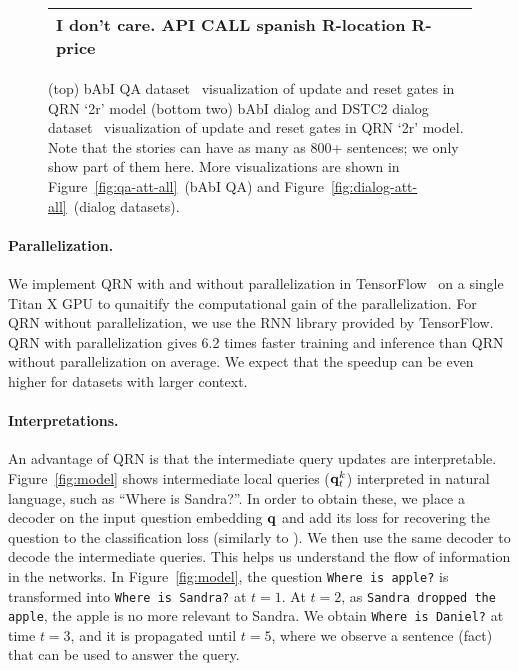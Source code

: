 \documentclass[table]{article}
\begin{document}
\begin{figure}[t]
{\begin{tabular}{|p{6.5cm}|ccc|c|}
    \hline
    
    \multicolumn{5}{|l|}{I don't care. \hfill API CALL spanish R-location R-price}\\
    
    \hline
    \end{tabular}
    }
    
    \caption{\small (top) bAbI QA dataset~\citep{babi} visualization of update and reset gates in QRN `2r' model (bottom two) bAbI dialog and DSTC2 dialog dataset~\citep{bordes2016learning} visualization of update and reset gates in QRN `2r' model.
Note that the stories can have as many as 800+ sentences; we only show part of them here. More visualizations are shown in Figure~\ref{fig:qa-att-all}~(bAbI QA) and Figure~\ref{fig:dialog-att-all}~(dialog datasets).
    }
    \label{fig:att-summary}
\end{figure}




\paragraph{Parallelization.}
We implement QRN with and without parallelization in TensorFlow~\citep{tensorflow} on a single Titan X GPU to qunaitify the computational gain of the parallelization.
For QRN without parallelization, we use the RNN library provided by TensorFlow. 
QRN with parallelization gives 6.2 times faster training and inference than QRN without parallelization on average.
We expect that the speedup can be even higher for datasets with larger context.

\paragraph{Interpretations.}
An advantage of QRN is that the intermediate query updates are interpretable.
Figure~\ref{fig:model} shows intermediate local queries (${\bf q}^k_t$) interpreted in natural language, such as ``Where is Sandra?''.
In order to obtain these, we place a decoder on the input question embedding ${\bf q}$ and add its loss for recovering the question to the classification loss (similarly to \citet{NR}).
We then use the same decoder to decode the intermediate queries.
This helps us understand the flow of information in the networks. 
In Figure~\ref{fig:model}, the question \texttt{Where is apple?} is transformed into \texttt{Where is Sandra?} at $t=1$.
At $t=2$, as \texttt{Sandra dropped the apple}, the apple is no more relevant to Sandra.
We obtain \texttt{Where is Daniel?} at time $t = 3$, and it is propagated until $t=5$, where we observe a sentence (fact) that can be used to answer the query.
\end{document}
